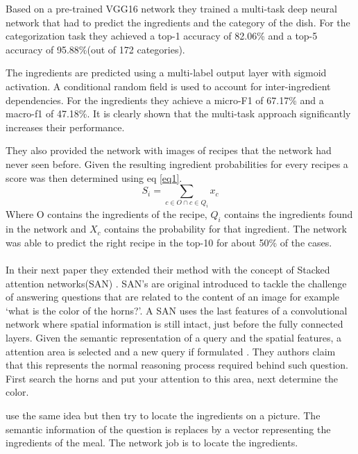 \documentclass[a4paper]{scrartcl}
\begin{document}
Based on a pre-trained VGG16 network they trained a multi-task deep neural network that had to predict the ingredients and the category of the dish. For the categorization task they achieved a top-1 accuracy of 82.06\% and a top-5 accuracy of 95.88\%(out of 172 categories). 

The ingredients are predicted using a multi-label output layer with sigmoid activation. A conditional random field is used to account for inter-ingredient dependencies.   For the ingredients they achieve a micro-F1 of 67.17\% and a macro-f1 of 47.18\%. It is clearly shown that the multi-task approach significantly increases their performance. 

They also provided the network with images of recipes that the network had never seen before. Given the resulting ingredient probabilities for every recipes a score was then determined using eq \ref{eq1}. \begin{equation}
    S_i = \sum_{c \in O \cap c \in Q_i } x_c
    \label{eq1}
\end{equation}
Where O contains the ingredients of the recipe, $Q_i$ contains the ingredients found in the network and $X_c$ contains the probability for that ingredient. The network was able to predict the right recipe in the top-10 for about 50\% of the cases. \\ \\


In their next paper they extended their method with the concept of Stacked attention networks(SAN) \cite{yang2016stacked}. SAN's are original introduced to tackle the challenge of answering questions that are related to the content of an image for example `what is the color of the horns?'. A SAN uses the last features of a convolutional network where spatial information is still intact, just before the fully connected layers. Given the semantic representation of a query and the spatial features, a attention area is selected and a new query if formulated . They authors claim that this represents the normal reasoning process required behind such question. First search the horns and put your attention to this area, next determine the color. 

 use the same idea but then try to locate the ingredients on a picture. The semantic information of the question is replaces by a vector representing the ingredients of the meal. The network job is to locate the ingredients.  
\end{document}
